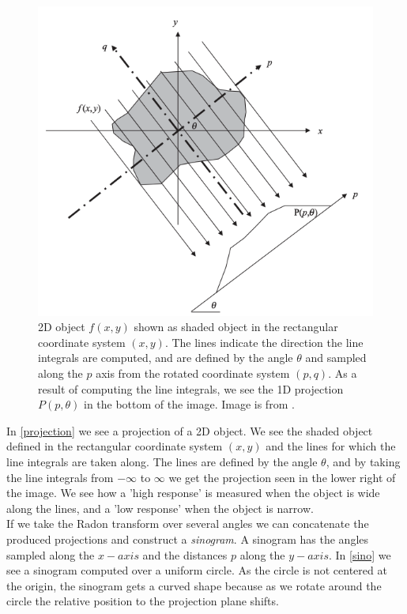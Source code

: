 \begin{figure}
	\centering
	\includegraphics[width=\linewidth]{Materials/Projection}
	\caption{2D object $f(x,y)$ shown as shaded object in the rectangular coordinate system $(x,y)$. The lines indicate the direction the line integrals are computed, and are defined by the angle $\theta$ and sampled along the $p$ axis from the rotated coordinate system $(p,q)$. As a result of computing the line integrals, we see the 1D projection $P(p,\theta)$ in the bottom of the image. Image is from \cite{MIA}.}
	\label{projection}
\end{figure}
In \autoref{projection} we see a projection of a 2D object. We see the shaded object defined in the rectangular coordinate system $(x,y)$ and the lines for which the line integrals are taken along. The lines are defined by the angle $\theta$, and by taking the line integrals from $-\infty$ to $\infty$ we get the projection seen in the lower right of the image. We see how a 'high response' is measured when the object is wide along the lines, and a 'low response' when the object is narrow.\\
If we take the Radon transform over several angles we can concatenate the produced projections and construct a \textit{sinogram}. A sinogram has the angles sampled along the $x-axis$ and the distances $p$ along the $y-axis$. In \autoref{sino} we see a sinogram computed over a uniform circle. As the circle is not centered at the origin, the sinogram gets a curved shape because as we rotate around the circle the relative position to the projection plane shifts.


